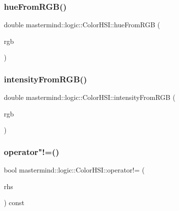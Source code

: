 \subsubsection{\texorpdfstring{hue\+From\+R\+G\+B()}{hueFromRGB()}}
{\footnotesize\ttfamily double mastermind\+::logic\+::\+Color\+H\+S\+I\+::hue\+From\+R\+GB (\begin{DoxyParamCaption}\item[{const \hyperlink{classmastermind_1_1logic_1_1_color_r_g_b}{Color\+R\+GB} \&}]{rgb }\end{DoxyParamCaption})\hspace{0.3cm}{\ttfamily [static]}}

\hypertarget{classmastermind_1_1logic_1_1_color_h_s_i_a921bf6e8d5e9d71d2823b2db2c9c84cb}{}\label{classmastermind_1_1logic_1_1_color_h_s_i_a921bf6e8d5e9d71d2823b2db2c9c84cb} 
\subsubsection{\texorpdfstring{intensity\+From\+R\+G\+B()}{intensityFromRGB()}}
{\footnotesize\ttfamily double mastermind\+::logic\+::\+Color\+H\+S\+I\+::intensity\+From\+R\+GB (\begin{DoxyParamCaption}\item[{const \hyperlink{classmastermind_1_1logic_1_1_color_r_g_b}{Color\+R\+GB} \&}]{rgb }\end{DoxyParamCaption})\hspace{0.3cm}{\ttfamily [static]}}

\hypertarget{classmastermind_1_1logic_1_1_color_h_s_i_a32082591e8e68503c45e0516d7f62748}{}\label{classmastermind_1_1logic_1_1_color_h_s_i_a32082591e8e68503c45e0516d7f62748} 
\subsubsection{\texorpdfstring{operator"!=()}{operator!=()}}
{\footnotesize\ttfamily bool mastermind\+::logic\+::\+Color\+H\+S\+I\+::operator!= (\begin{DoxyParamCaption}\item[{const \hyperlink{classmastermind_1_1logic_1_1_color_h_s_i}{Color\+H\+SI} \&}]{rhs }\end{DoxyParamCaption}) const}

